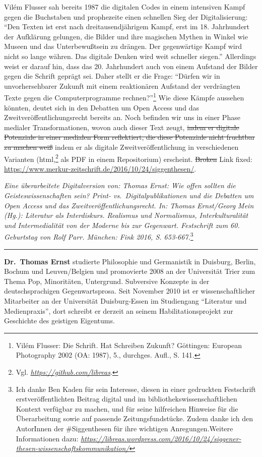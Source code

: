 \documentclass[a4paper,
fontsize=11pt,
oneside,
numbers=noperiodatend,
parskip=half-,
bibliography=totoc,
final
]{scrartcl}
\begin{document}
Vilém Flusser sah bereits 1987 die digitalen Codes in einem intensiven
Kampf gegen die Buchstaben und prophezeite einen schnellen Sieg der
Digitalisierung: \enquote{Den Texten ist erst nach dreitausendjährigem
Kampf, erst im 18. Jahrhundert der Aufklärung gelungen, die Bilder und
ihre magischen Mythen in Winkel wie Museen und das Unterbewußtsein zu
drängen. Der gegenwärtige Kampf wird nicht so lange währen. Das digitale
Denken wird weit schneller siegen.} Allerdings weist er darauf hin, dass
das 20. Jahrhundert auch von einem Aufstand der Bilder gegen die Schrift
geprägt sei. Daher stellt er die Frage: \enquote{Dürfen wir in
unvorhersehbarer Zukunft mit einem reaktionären Aufstand der verdrängten
Texte gegen die Computerprogramme rechnen?}\footnote{Vilém Flusser: Die
  Schrift. Hat Schreiben Zukunft? Göttingen: European Photography 2002
  (OA: 1987), 5., durchges. Aufl., S. 141.} Wie diese Kämpfe aussehen
könnten, deutet sich in den Debatten um Open Access und das
Zweitveröffentlichungsrecht bereits an. Noch befinden wir uns in einer
Phase medialer Transformationen, wovon auch dieser Text zeugt,
\sout{indem
er digitale Potenziale in einer medialen Form reflektiert, die diese
Potenziale nicht fruchtbar zu machen weiß} indem er als digitale
Zweitveröffentlichung in verschiedenen Varianten (html,\footnote{Vgl.
  \href{https://github.com/libreas}{\emph{https://github.com/libreas}}.}
als PDF in einem Repositorium) erscheint. \sout{Broken} Link fixed:
\url{https://www.merkur-zeitschrift.de/2016/10/24/siggenthesen/}.

\emph{Eine überarbeitete Digitalversion von: Thomas Ernst: Wie offen
sollten die Geisteswissenschaften sein? Print- vs.~Digitalpublikationen
und die Debatten um Open Access und das Zweitveröffentlichungsrecht. In:
Thomas Ernst/Georg Mein (Hg.): Literatur als Interdiskurs. Realismus und
Normalismus, Interkulturalität und Intermedialität von der Moderne bis
zur Gegenwart. Festschrift zum 60. Geburtstag von Rolf Parr. München:
Fink 2016, S. 653-667.}\footnote{Ich danke Ben Kaden für sein Interesse,
  diesen in einer gedruckten Festschrift erstveröffentlichten Beitrag
  digital und im bibliothekswissenschaftlichen Kontext verfügbar zu
  machen, und für seine hilfreichen Hinweise für die Überarbeitung sowie
  auf passende Zeitungsfundstücke. Zudem danke ich den AutorInnen der
  \#Siggenthesen für ihre wichtigen Anregungen.Weitere Informationen
  dazu:
  \href{https://libreas.wordpress.com/2016/10/24/siggener-thesen-wissenschaftskommunikation/}{\emph{https://libreas.wordpress.com/2016/10/24/siggener-thesen-wissenschaftskommunikation/}}}

\begin{center}\rule{0.5\linewidth}{\linethickness}\end{center}

\textbf{Dr.~Thomas Ernst} studierte Philosophie und Germanistik in
Duisburg, Berlin, Bochum und Leuven/Belgien und promovierte 2008 an der
Universität Trier zum Thema Pop, Minoritäten, Untergrund. Subversive
Konzepte in der deutschsprachigen Gegenwartsprosa. Seit November 2010
ist er wissenschaftlicher Mitarbeiter an der Universität Duisburg-Essen
im Studiengang ``Literatur und Medienpraxis'', dort schreibt er derzeit
an seinem Habilitationsprojekt zur Geschichte des geistigen Eigentums.
\end{document}
